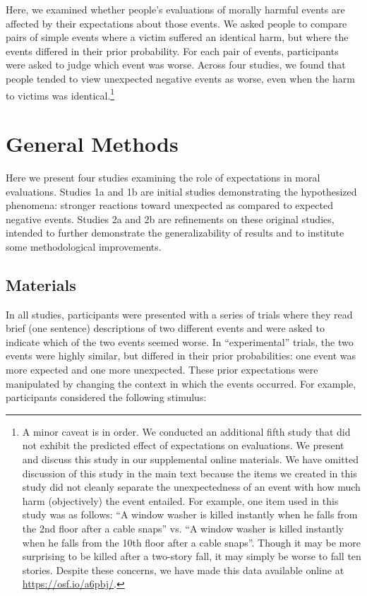 \documentclass[10pt, letterpaper]{article}
\begin{document}
Here, we examined whether people's evaluations of morally harmful events
are affected by their expectations about those events. We asked people
to compare pairs of simple events where a victim suffered an identical
harm, but where the events differed in their prior probability. For each
pair of events, participants were asked to judge which event was worse.
Across four studies, we found that people tended to view unexpected
negative events as worse, even when the harm to victims was
identical.\footnote{A minor caveat is in order. We conducted an
  additional fifth study that did not exhibit the predicted effect of
  expectations on evaluations. We present and discuss this study in our
  supplemental online materials. We have omitted discussion of this
  study in the main text because the items we created in this study did
  not cleanly separate the unexpectedness of an event with how much harm
  (objectively) the event entailed. For example, one item used in this
  study was as follows: ``A window washer is killed instantly when he
  falls from the 2nd floor after a cable snaps'' vs. ``A window washer
  is killed instantly when he falls from the 10th floor after a cable
  snaps''. Though it may be more surprising to be killed after a
  two-story fall, it may simply be worse to fall ten stories. Despite
  these concerns, we have made this data available online at
  \url{https://osf.io/a6pbj/}.}

\section{General Methods}\label{general-methods}

Here we present four studies examining the role of expectations in moral
evaluations. Studies 1a and 1b are initial studies demonstrating the
hypothesized phenomena: stronger reactions toward unexpected as compared
to expected negative events. Studies 2a and 2b are refinements on these
original studies, intended to further demonstrate the generalizability
of results and to institute some methodological improvements.

\subsection{Materials}\label{materials}

In all studies, participants were presented with a series of trials
where they read brief (one sentence) descriptions of two different
events and were asked to indicate which of the two events seemed worse.
In ``experimental'' trials, the two events were highly similar, but
differed in their prior probabilities: one event was more expected and
one more unexpected. These prior expectations were manipulated by
changing the context in which the events occurred. For example,
participants considered the following stimulus:
\end{document}
